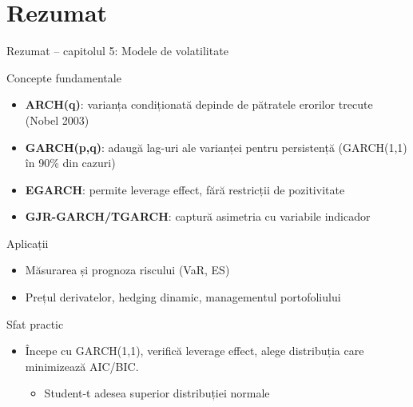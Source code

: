 \documentclass[9pt, aspectratio=169, t]{beamer}
\begin{document}
\section{Rezumat}

\begin{frame}{Rezumat -- capitolul 5: Modele de volatilitate}
    \small
    \vspace{-0.2cm}
        \begin{block}{Concepte fundamentale}
            \begin{itemize}
                \item \textbf{ARCH(q)}: varianța condiționată depinde de pătratele erorilor trecute (Nobel 2003)
                \item \textbf{GARCH(p,q)}: adaugă lag-uri ale varianței pentru persistență (GARCH(1,1) în 90\% din cazuri)
                \item \textbf{EGARCH}: permite leverage effect, fără restricții de pozitivitate
                \item \textbf{GJR-GARCH/TGARCH}: captură asimetria cu variabile indicador
            \end{itemize}
        \end{block}
        \vspace{-0.2cm}
        \begin{block}{Aplicații}
            \begin{itemize}
                \item Măsurarea și prognoza riscului (VaR, ES)
                \item Prețul derivatelor, hedging dinamic, managementul portofoliului
            \end{itemize}
        \end{block}
        \vspace{-0.2cm}
        \begin{alertblock}{Sfat practic}
            \begin{itemize}
                \item Începe cu GARCH(1,1), verifică leverage effect, alege distribuția care minimizează AIC/BIC.
                    \begin{itemize}
                        \item Student-t adesea superior distribuției normale
                    \end{itemize}
            \end{itemize}
        \end{alertblock}
\end{frame}
\end{document}
